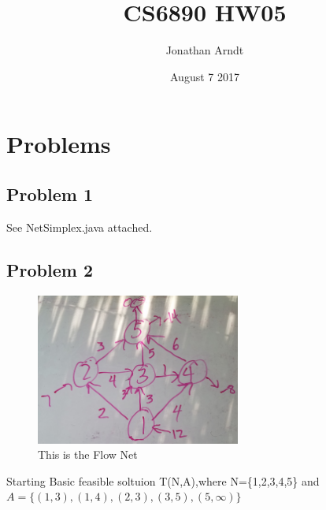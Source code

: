\documentclass[11pt,a4paper,openany]{report}
\title{CS6890 HW05}
\author{Jonathan Arndt }
\date{August 7 2017}
\begin{document}
\maketitle

\tableofcontents
\newpage
\section{Problems}
\subsection{Problem 1}
See NetSimplex.java attached.

\subsection{Problem 2}
\begin{figure}[h]
  \centering
  \includegraphics[width=0.6\textwidth]{lp5_2_cropped}
  \caption{This is the Flow Net}
\end{figure}

Starting Basic feasible soltuion T(N,A),where N=\{1,2,3,4,5\} and \\ $A=\{(1,3),(1,4),(2,3),(3,5),(5,\infty)\}$\\\\
\end{document}
